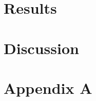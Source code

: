 \documentclass[twoside]{article}
\begin{document}
\begin{multicols}{2}

\section{Results}

\lipsum[12-14]



\section{Discussion}

\lipsum[15-16]




{}


\section*{Appendix A}

\lipsum[17]


\end{multicols}
\end{document}
